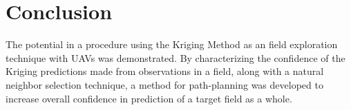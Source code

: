 \chapter{Conclusion}
The potential in a procedure using the Kriging Method as an field exploration technique with UAVs was demonstrated. By characterizing the confidence of the Kriging predictions made from observations in a field, along with a natural neighbor selection technique, a method for path-planning was developed to increase overall confidence in prediction of a target field as a whole.